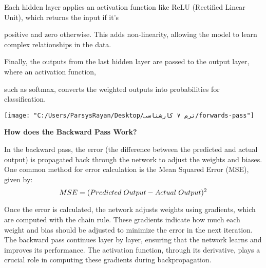 \documentclass{report}
\begin{document}
	Each hidden layer applies an activation function like ReLU (Rectified Linear Unit), which returns the input if it’s
	
	 positive and zero otherwise. This adds non-linearity, allowing the model to learn complex relationships in the data.
	 
	  Finally, the outputs from the last hidden layer are passed to the output layer, where an activation function,
	  
	   such as softmax, converts the weighted outputs into probabilities for classification.
	   
	   \centering
	\texttt{[image: "C:/Users/ParsysRayan/Desktop/ترم ۷ کارشناسی/forwards-pass"]}

    \vspace{0.5cm}
    
    \textbf{How does the Backward Pass Work?}
    
    \vspace{0.3cm}
    
    In the backward pass, the error (the difference between the predicted and actual output) is propagated back through the network to adjust the weights and biases. One common method for error calculation is the Mean Squared Error (MSE), given by:
    \begin{equation}
    MSE = (Predicted \hspace{0.1cm} Output - Actual \hspace{0.1cm} Output)^2
\end{equation}
    
    Once the error is calculated, the network adjusts weights using gradients, which are computed with the chain rule. These gradients indicate how much each weight and bias should be adjusted to minimize the error in the next iteration. The backward pass continues layer by layer, ensuring that the network learns and improves its performance. The activation function, through its derivative, plays a crucial role in computing these gradients during backpropagation.
\end{document}
